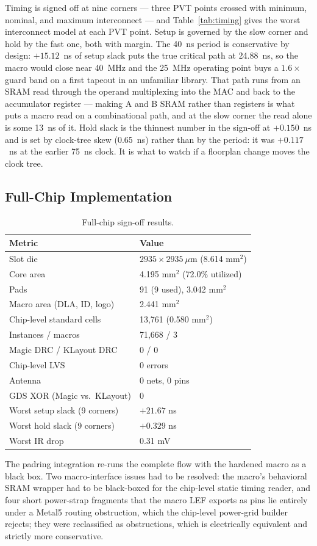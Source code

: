 \documentclass[conference,a4paper]{APSIPA2026}
\begin{document}
Timing is signed off at nine corners --- three PVT points crossed with minimum, nominal, and maximum interconnect --- and Table~\ref{tab:timing} gives the worst interconnect model at each PVT point. Setup is governed by the slow corner and hold by the fast one, both with margin. The 40~ns period is conservative by design: $+15.12$~ns of setup slack puts the true critical path at 24.88~ns, so the macro would close near 40~MHz and the 25~MHz operating point buys a $1.6\times$ guard band on a first tapeout in an unfamiliar library. That path runs from an SRAM read through the operand multiplexing into the MAC and back to the accumulator register --- making A and B SRAM rather than registers is what puts a macro read on a combinational path, and at the slow corner the read alone is some 13~ns of it. Hold slack is the thinnest number in the sign-off at $+0.150$~ns and is set by clock-tree skew (0.65~ns) rather than by the period: it was $+0.117$~ns at the earlier 75~ns clock. It is what to watch if a floorplan change moves the clock tree.

\subsection{Full-Chip Implementation}

\begin{table}[!ht]
\caption{Full-chip sign-off results.}
\label{tab:chip}
\centering
\renewcommand{\arraystretch}{1.08}
\begin{tabular}{@{}ll@{}}
\toprule
Metric & Value \\
\midrule
Slot die & $2935\times2935~\mu$m (8.614 mm$^2$) \\
Core area & 4.195 mm$^2$ (72.0\% utilized) \\
Pads & 91 (9 used), 3.042 mm$^2$ \\
Macro area (DLA, ID, logo) & 2.441 mm$^2$ \\
Chip-level standard cells & 13,761 (0.580 mm$^2$) \\
Instances / macros & 71,668 / 3 \\
Magic DRC / KLayout DRC & 0 / 0 \\
Chip-level LVS & 0 errors \\
Antenna & 0 nets, 0 pins \\
GDS XOR (Magic vs.\ KLayout) & 0 \\
Worst setup slack (9 corners) & $+21.67$ ns \\
Worst hold slack (9 corners) & $+0.329$ ns \\
Worst IR drop & 0.31 mV \\
\bottomrule
\end{tabular}
\end{table}
The padring integration re-runs the complete flow with the hardened macro as a black box. Two macro-interface issues had to be resolved: the macro's behavioral SRAM wrapper had to be black-boxed for the chip-level static timing reader, and four short power-strap fragments that the macro LEF exports as pins lie entirely under a Metal5 routing obstruction, which the chip-level power-grid builder rejects; they were reclassified as obstructions, which is electrically equivalent and strictly more conservative.
\end{document}
